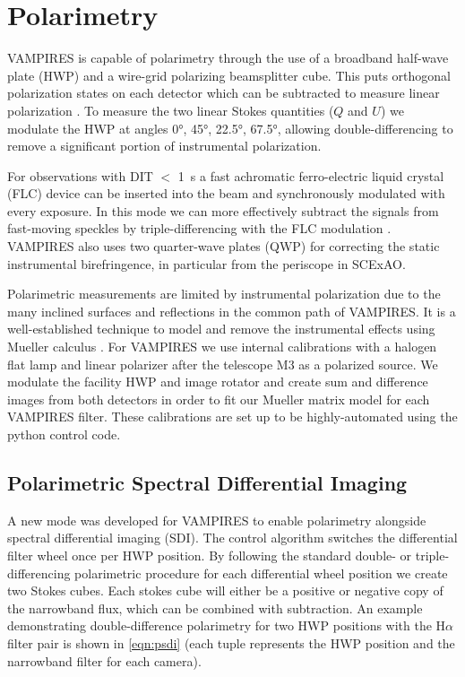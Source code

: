 \section{Polarimetry}\label{sec:polarimetry}

VAMPIRES is capable of polarimetry through the use of a broadband half-wave plate (HWP) and a wire-grid polarizing beamsplitter cube. This puts orthogonal polarization states on each detector which can be subtracted to measure linear polarization \citep{kuhn_imaging_2001}. To measure the two linear Stokes quantities ($Q$ and $U$) we modulate the HWP at angles \ang{0}, \ang{45}, \ang{22.5}, \ang{67.5}, allowing double-differencing to remove a significant portion of instrumental polarization.

For observations with DIT $<$ \qty{1}{\second} a fast achromatic ferro-electric liquid crystal (FLC) device can be inserted into the beam and synchronously modulated with every exposure. In this mode we can more effectively subtract the signals from fast-moving speckles by triple-differencing with the FLC modulation \citep{norris_vampires_2015}. VAMPIRES also uses two quarter-wave plates (QWP) for correcting the static instrumental birefringence, in particular from the periscope in SCExAO.

Polarimetric measurements are limited by instrumental polarization due to the many inclined surfaces and reflections in the common path of VAMPIRES. It is a well-established technique to model and remove the instrumental effects using Mueller calculus \citep{holstein_polarimetric_2020,joost_t_hart_full_2021}. For VAMPIRES we use internal calibrations with a halogen flat lamp and linear polarizer after the telescope M3 as a polarized source. We modulate the facility HWP and image rotator and create sum and difference images from both detectors in order to fit our Mueller matrix model for each VAMPIRES filter.  These calibrations are set up to be highly-automated using the python control code. 

\subsection{Polarimetric Spectral Differential Imaging}

A new mode was developed for VAMPIRES to enable polarimetry alongside spectral differential imaging (SDI). The control algorithm switches the differential filter wheel once per HWP position. By following the standard double- or triple-differencing polarimetric procedure for each differential wheel position we create two Stokes cubes. Each stokes cube will either be a positive or negative copy of the narrowband flux, which can be combined with subtraction. An example demonstrating double-difference polarimetry for two HWP positions with the H$\alpha$ filter pair is shown in \autoref{eqn:psdi} (each tuple represents the HWP position and the narrowband filter for each camera).

